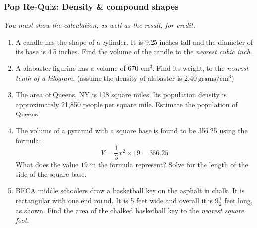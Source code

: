 \documentclass[12pt, twoside]{article}
\begin{document}
\subsubsection*{Pop Re-Quiz: Density \& compound shapes}
\emph{You must show the calculation, as well as the result, for credit.}
 \begin{enumerate}

\item A candle has the shape of a cylinder. It is 9.25 inches tall and the diameter of its base is 4.5 inches. Find the volume of the candle to the \emph{nearest cubic inch}. \vspace{3cm}

\item A alabaster figurine has a volume of 670 cm$^3$. Find its weight, to the \emph{nearest tenth of a kilogram}. (assume the density of alabaster is $2.40 \ \mathrm{grams}/ \mathrm{cm}^3$) \vspace{3cm}

\item The area of Queens, NY is 108 square miles. Its population density is approximately 21,850 people per square mile. Estimate the population of Queens. \vspace{3cm}

\item The volume of a pyramid with a square base is found to be 356.25 using the formula:
  \[V=\frac{1}{3} x^2 \times 19=356.25\]
  What does the value $19$ in the formula represent? Solve for the length of the side of the square base. \vspace{4cm}

\newpage
\item BECA middle schoolers draw a basketball key on the asphalt in chalk. It is rectangular with one end round. It is 5 feet wide and overall it is $9 \frac{1}{2}$ feet long, as shown. Find the area of the chalked basketball key to the \emph{nearest square foot}.\\[1.5cm]


\end{enumerate}
\end{document}
